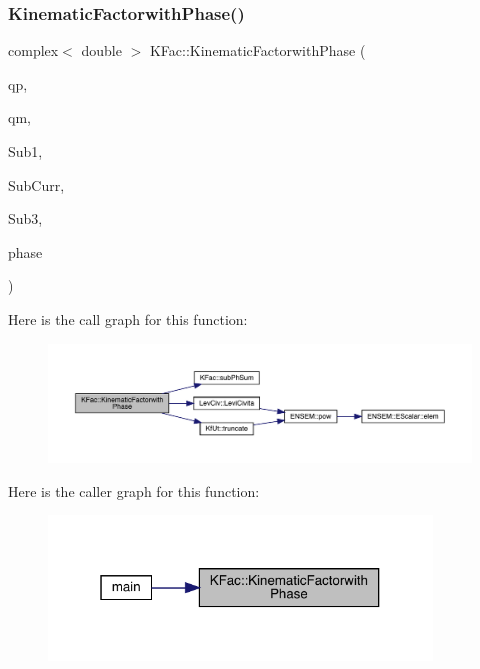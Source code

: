 \subsubsection{\texorpdfstring{KinematicFactorwithPhase()}{KinematicFactorwithPhase()}\hspace{0.1cm}{\footnotesize\ttfamily [2/2]}}
{\footnotesize\ttfamily complex$<$ double $>$ K\+Fac\+::\+Kinematic\+Factorwith\+Phase (\begin{DoxyParamCaption}\item[{Eigen\+::\+Vector\+Xd \&}]{qp,  }\item[{Eigen\+::\+Vector\+Xd \&}]{qm,  }\item[{map$<$ int, Eigen\+::\+Matrix\+Xcd $>$ \&}]{Sub1,  }\item[{map$<$ int, Eigen\+::\+Matrix\+Xcd $>$ \&}]{Sub\+Curr,  }\item[{map$<$ int, Eigen\+::\+Matrix\+Xcd $>$ \&}]{Sub3,  }\item[{\mbox{\hyperlink{structPh_1_1phChars}{Ph\+::ph\+Chars}} \&}]{phase }\end{DoxyParamCaption})}

Here is the call graph for this function\+:\nopagebreak
\begin{figure}[H]
\begin{center}
\leavevmode
\includegraphics[width=350pt]{d2/d89/namespaceKFac_ac10b1bd8db1661c292e327a3eabcebb9_cgraph}
\end{center}
\end{figure}
Here is the caller graph for this function\+:\nopagebreak
\begin{figure}[H]
\begin{center}
\leavevmode
\includegraphics[width=289pt]{d2/d89/namespaceKFac_ac10b1bd8db1661c292e327a3eabcebb9_icgraph}
\end{center}
\end{figure}
\mbox{\label{namespaceKFac_a8a20f176fbf91758f8699734b8df3f04}} 
